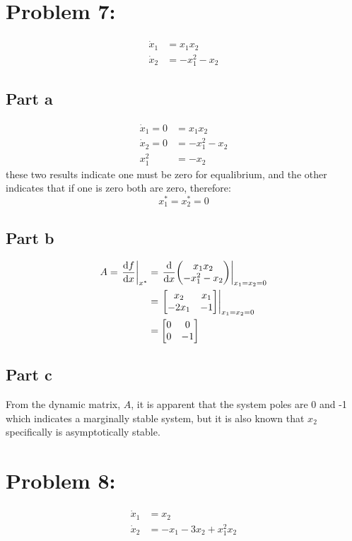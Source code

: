 \documentclass[]{article}
\begin{document}
\section{Problem 7:}

\begin{align*}
	\dot{x}_1 &= x_1 x_2\\
	\dot{x}_2 &= -x_1^2 -x_2
\end{align*}

\subsection{Part a}
\begin{align*}
	\dot{x}_1 = 0 &= x_1 x_2\\
	\dot{x}_2 = 0 &= -x_1^2 -x_2\\
	x_1^2 &= -x_2
\end{align*}
these two results indicate one must be zero for equalibrium, and the other indicates that if one is zero both are zero, therefore:
\begin{displaymath}
	x_1^* = x_2^* = 0
\end{displaymath}

\subsection{Part b}

\begin{align*}
	A = \eval{\dv{f}{x}}_{x^*} &= \eval{\dv{x} \mqty(x_1 x_2\\ -x_1^2 -x_2)}_{x_1=x_2=0}\\
	&= \eval{\mqty[x_2 & x_1\\ -2 x_1 & -1]}_{x_1=x_2=0}\\
	&= \mqty[0&0\\0 &-1]
\end{align*}


\subsection{Part c}
From the dynamic matrix, $A$, it is apparent that the system poles are 0 and -1 which indicates a marginally stable system, but it is also known that $x_2$ specifically is asymptotically stable.

\newpage
\section{Problem 8:}
\begin{align*}
	\dot{x}_1 &= x_2\\
	\dot{x}_2 &= -x_1 - 3 x_2 + x_1^2 x_2
\end{align*}
\end{document}
